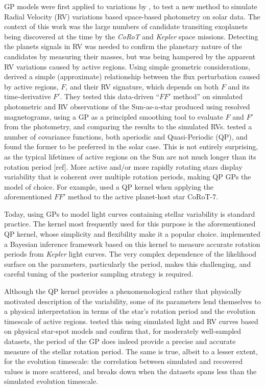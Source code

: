 \documentclass[letterpaper]{ar-1col}
\begin{document}
GP models were first applied to variations by \citet{2012MNRAS.419.3147A}, to test a new method to simulate Radial Velocity (RV) variations based space-based photometry on solar data. The context of this work was the large numbers of candidate transiting exoplanets being discovered at the time by the \textit{CoRoT} and \textit{Kepler} space missions. Detecting the planets signals in RV was needed to confirm the planetary nature of the candidates by measuring their masses, but was being hampered by the apparent RV variations caused by active regions. Using simple geometric considerations, \citet{2012MNRAS.419.3147A} derived a simple (approximate) relationship between the flux perturbation caused by active regions, $F$, and their RV signature, which depends on both $F$ and its time-derivative $F'$. They tested this data-driven ``$FF'$ method'' on simulated photometric and RV observations of the Sun-as-a-star produced using resolved magnetograms, using a GP as a principled smoothing tool to evaluate $F$ and $F'$ from the photometry, and comparing the results to the simulated RVs. \citet{2012MNRAS.419.3147A}  tested a number of covariance functions, both aperiodic and Quasi-Periodic (QP), and found the former to be preferred in the solar case. This is not entirely surprising, as the typical lifetimes of active regions on the Sun are not much longer than its rotation period [ref]. More active and/or more rapidly rotating stars display variability that is coherent over multiple rotation periods, making QP GPs the model of choice. For example, \citet{2014MNRAS.443.2517H} used a QP kernel when applying the aforementioned $FF'$ method to the active planet-host star CoRoT-7.

Today, using GPs to model light curves containing stellar variability is standard practice. The kernel most frequently used for this purpose is the aforementioned QP kernel, whose simplicity and flexibility make it a popular choice. \citep{2018MNRAS.474.2094A} implemented a Bayesian inference framework based on this kernel to measure accurate rotation periods from \textit{Kepler} light curves. The very complex dependence of the likelihood surface on the parameters, particularly the period, makes this challenging, and careful tuning of the posterior sampling strategy is required.

Although the QP kernel provides a phenomenological rather that physically motivated description of the variability, some of its parameters lend themselves to a physical interpretation in terms of the star's rotation period and the evolution timescale of active regions. \citep{2022MNRAS.tmp.2007N} tested this using simulated light and RV curves based on physical star-spot models and confirm that, for moderately well-sampled datasets, the period of the GP does indeed provide a precise and accurate measure of the stellar rotation period. The same is true, albeit to a lesser extent, for the evolution timescale: the correlation between simulated and recovered values is more scattered, and breaks down when the datasets spans less than the simulated evolution timescale.
\end{document}
